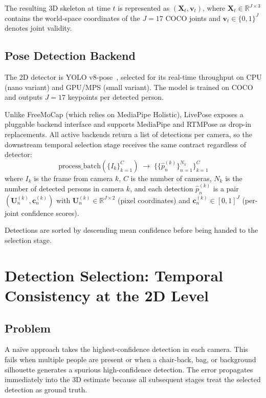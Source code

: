 \documentclass[11pt,a4paper]{article}
\newcommand{\R}{\mathbb{R}}
\begin{document}
The resulting 3D skeleton at time $t$ is represented as
$(\mathbf{X}_t, \mathbf{v}_t)$, where $\mathbf{X}_t \in \mathbb{R}^{J \times 3}$
contains the world-space coordinates of the $J=17$ COCO joints and
$\mathbf{v}_t \in \{0,1\}^J$ denotes joint validity.

\subsection{Pose Detection Backend}

The 2D detector is YOLO v8-pose~\cite{yolov8}, selected for its real-time throughput
on CPU (nano variant) and GPU/MPS (small variant). The model is trained on COCO and
outputs $J=17$ keypoints per detected person.

Unlike FreeMoCap (which relies on MediaPipe Holistic), LivePose exposes a pluggable
backend interface and supports MediaPipe and RTMPose as drop-in replacements. All
active backends return a list of detections per camera, so the downstream temporal
selection stage receives the same contract regardless of detector:
\begin{equation}
  \text{process\_batch}(\{I_k\}_{k=1}^{C})
  \;\longrightarrow\;
  \bigl\{\{\hat{p}^{(k)}_n\}_{n=1}^{N_k}\bigr\}_{k=1}^{C}
\end{equation}
where $I_k$ is the frame from camera $k$, $C$ is the number of cameras, $N_k$ is the
number of detected persons in camera $k$, and each detection $\hat{p}^{(k)}_n$ is a
pair $(\mathbf{U}^{(k)}_n, \mathbf{c}^{(k)}_n)$ with
$\mathbf{U}^{(k)}_n \in \R^{J \times 2}$ (pixel coordinates) and
$\mathbf{c}^{(k)}_n \in [0,1]^J$ (per-joint confidence scores).

Detections are sorted by descending mean confidence before being handed to the
selection stage.

\section{Detection Selection: Temporal Consistency at the 2D Level}

\subsection{Problem}

A na\"ive approach takes the highest-confidence detection in each camera. This fails
when multiple people are present or when a chair-back, bag, or background silhouette
generates a spurious high-confidence detection. The error propagates immediately into
the 3D estimate because all subsequent stages treat the selected detection as ground
truth.
\end{document}
